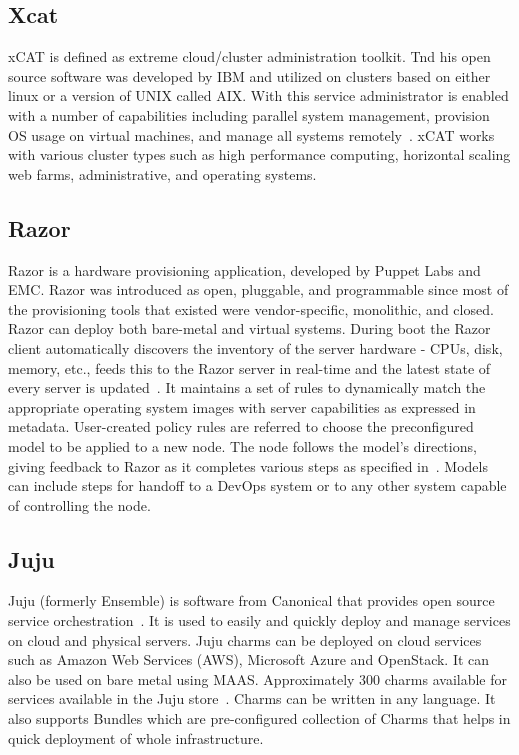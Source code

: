 \subsection{Xcat}

xCAT is defined as extreme cloud/cluster administration toolkit. Tnd
his open source software was developed by IBM and utilized on clusters
based on either linux or a version of UNIX called AIX. With this
service administrator is enabled with a number of capabilities
including parallel system management, provision OS usage on virtual
machines, and manage all systems remotely~\cite{www-xcat}. xCAT works
with various cluster types such as high performance computing,
horizontal scaling web farms, administrative, and operating
systems.~\cite{www-03ibm}

     \pv
     
\subsection{Razor}

Razor is a hardware provisioning application, developed by Puppet Labs
and EMC. Razor was introduced as open, pluggable, and programmable
since most of the provisioning tools that existed were
vendor-specific, monolithic, and closed. Razor can deploy both
bare-metal and virtual systems. During boot the Razor client
automatically discovers the inventory of the server hardware - CPUs,
disk, memory, etc., feeds this to the Razor server in real-time and
the latest state of every server is updated~\cite{www-RazorWiki}. It
maintains a set of rules to dynamically match the appropriate
operating system images with server capabilities as expressed in
metadata. User-created policy rules are referred to choose the
preconfigured model to be applied to a new node. The node follows the
model's directions, giving feedback to Razor as it completes various
steps as specified in~\cite{www-RazorPuppet}. Models can include steps
for handoff to a DevOps system or to any other system capable of
controlling the node.

     \pv

\subsection{Juju}

Juju (formerly Ensemble) is software from Canonical that provides open
source service orchestration~\cite{juju-paper}.  It is used to easily
and quickly deploy and manage services on cloud and physical
servers. Juju charms can be deployed on cloud services such as Amazon
Web Services (AWS), Microsoft Azure and OpenStack. It can also be used
on bare metal using MAAS.  Approximately 300 charms available for
services available in the Juju store~\cite{www-juju}. Charms can be
written in any language. It also supports Bundles which are
pre-configured collection of Charms that helps in quick deployment of
whole infrastructure.

